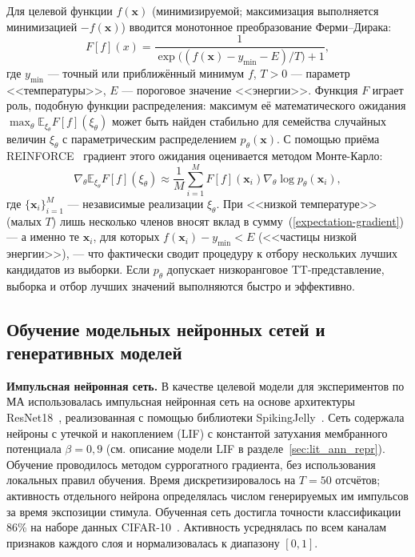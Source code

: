 Для целевой функции $f(\mathbf{x})$ (минимизируемой; максимизация выполняется минимизацией $-f(\mathbf{x})$) вводится монотонное преобразование Ферми--Дирака:
\begin{equation*}
    F[f](x) = \frac{1}{
        \exp \bigl(
            (f(\mathbf{x}) - y_{\text{min}} - E) / T
        \bigr)
        + 1
    },
\end{equation*}
где $y_\text{min}$ --- точный или приближённый минимум $f$, $T>0$ --- параметр <<температуры>>, $E$ --- пороговое значение <<энергии>>. Функция $F$ играет роль, подобную функции распределения: максимум её математического ожидания $\max_\theta \mathbb{E}_{\xi_\theta} F[f](\xi_\theta)$ может быть найден стабильно для семейства случайных величин $\xi_\theta$ с параметрическим распределением $p_\theta(\mathbf{x})$. С помощью приёма REINFORCE~\cite{REINFORCE-trick} градиент этого ожидания оценивается методом Монте-Карло:
\begin{equation}
    \nabla_\theta\mathbb{E}_{\xi_\theta}F[f](\xi_\theta)\approx \frac{1}{M}\sum_{i=1}^M
    F[f](\mathbf{x}_i)\nabla_\theta \log p_\theta(\mathbf{x}_i),
    \label{expectation-gradient}
\end{equation}
где $\{\mathbf{x}_i\}_{i=1}^{M}$ --- независимые реализации $\xi_\theta$. При <<низкой температуре>> (малых $T$) лишь несколько членов вносят вклад в сумму~(\ref{expectation-gradient}) --- а именно те $\mathbf{x}_i$, для которых $f(\mathbf{x}_i)-y_\text{min}<E$ (<<частицы низкой энергии>>), --- что фактически сводит процедуру к отбору нескольких лучших кандидатов из выборки. Если $p_\theta$ допускает низкоранговое TT-представление, выборка и отбор лучших значений выполняются быстро и эффективно.



\subsection{Обучение модельных нейронных сетей и генеративных моделей}\label{sec:mango_models}

\textbf{Импульсная нейронная сеть.}
В качестве целевой модели для экспериментов по МА использовалась импульсная нейронная сеть на основе архитектуры ResNet18~\cite{ResNet-paper}, реализованная с помощью библиотеки SpikingJelly~\cite{SpikingJelly-paper}. Сеть содержала нейроны с утечкой и накоплением (LIF) с константой затухания мембранного потенциала $\beta = 0{,}9$ (см. описание модели LIF в разделе~\ref{sec:lit_ann_repr}). Обучение проводилось методом суррогатного градиента, без использования локальных правил обучения. Время дискретизировалось на $T = 50$ отсчётов; активность отдельного нейрона определялась числом генерируемых им импульсов за время экспозиции стимула. Обученная сеть достигла точности классификации 86\% на наборе данных CIFAR-10~\cite{CIFAR10-dataset-reference}. Активность усреднялась по всем каналам признаков каждого слоя и нормализовалась к диапазону $[0, 1]$.

